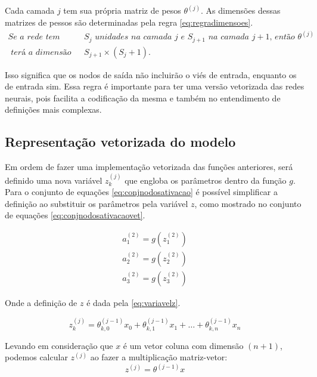 Cada camada $j$ tem sua própria matriz de pesos $\theta^{(j)}$. As dimensões dessas matrizes de pessos são determinadas pela regra \ref{eq:regradimensoes}. 
\begin{align} 
\textit{Se a rede tem } & S_j \textit{ unidades na camada } j \textit{ e } S_{j+1} \textit{ na camada } j+1\textit{, então } \theta^{(j)} \nonumber \\ 
\textit{ terá a dimensão de } & S_{j+1} \times (S_j + 1)\textit{.} \label{eq:regradimensoes}
\end{align}

Isso significa que os nodos de saída não incluirão o viés de entrada, enquanto os de entrada sim. Essa regra é importante para ter uma versão vetorizada das redes neurais, pois facilita a codificação da mesma e também no entendimento de definições mais complexas.


\subsection{Representação vetorizada do modelo}

Em ordem de fazer uma implementação vetorizada das funções anteriores, será definido uma nova variável $z_k^{(j)}$ que engloba os parâmetros dentro da função $g$. Para o conjunto de equações \ref{eq:conjnodosativacao} é possível simplificar a definição ao substituir os parâmetros pela variável $z$, como mostrado no conjunto de equações \ref{eq:conjnodosativacaovet}.

\begin{align}
a_1^{(2)} = g(z_1^{(2)}) \nonumber \\
a_2^{(2)} = g(z_2^{(2)}) \nonumber \\
a_3^{(2)} = g(z_3^{(2)}) \label{eq:conjnodosativacaovet}
\end{align}

Onde a definição de $z$ é dada pela \autoref{eq:variavelz}.

\begin{equation} \label{eq:variavelz}
z_k^{(j)} = \theta_{k,0}^{(j-1)}x_0 + \theta_{k,1}^{(j-1)}x_1 + \ldots + \theta_{k,n}^{(j-1)}x_n 
\end{equation}

Levando em consideração que $x$ é um vetor coluna com dimensão $(n+1)$, podemos calcular $z^{(j)}$ ao fazer a multiplicação matriz-vetor:
\begin{equation}
z^{(j)} = \theta^{(j-1)}x \nonumber
\end{equation}

